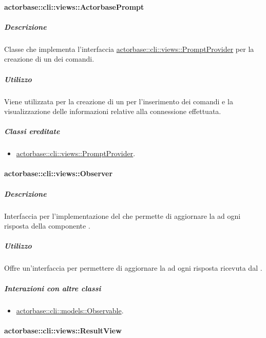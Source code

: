 \documentclass{scalatekids-article}
\begin{document}
\paragraph{actorbase::cli::views::ActorbasePrompt}
\label{sec:actorbase::cli::views::ActorbasePrompt}

\subparagraph{Descrizione}

Classe che implementa l'interfaccia \hyperref[sec:actorbase::cli::views::PromptProvider]{actorbase::cli::views::PromptProvider} per
la creazione di un  dei comandi.

\subparagraph{Utilizzo}

Viene utilizzata per la creazione di un  per l'inserimento dei
comandi e la visualizzazione delle informazioni relative alla connessione
effettuata. %

\subparagraph{Classi ereditate}

\begin{itemize}
\item \hyperref[sec:actorbase::cli::views::PromptProvider]{actorbase::cli::views::PromptProvider}.
\end{itemize}

\paragraph{actorbase::cli::views::Observer}
\label{sec:actorbase::cli::views::Observer}

\subparagraph{Descrizione}

Interfaccia per l'implementazione del  
che permette di aggiornare la  ad ogni risposta della componente
.

\subparagraph{Utilizzo}

Offre un'interfaccia per permettere di aggiornare la  ad ogni
risposta ricevuta dal .

\subparagraph{Interazioni con altre classi}

\begin{itemize}
\item \hyperref[sec:actorbase::cli::models::Observable]{actorbase::cli::models::Observable}.
\end{itemize}

\paragraph{actorbase::cli::views::ResultView}
\label{sec:actorbase::cli::views::ResultView}
\end{document}
